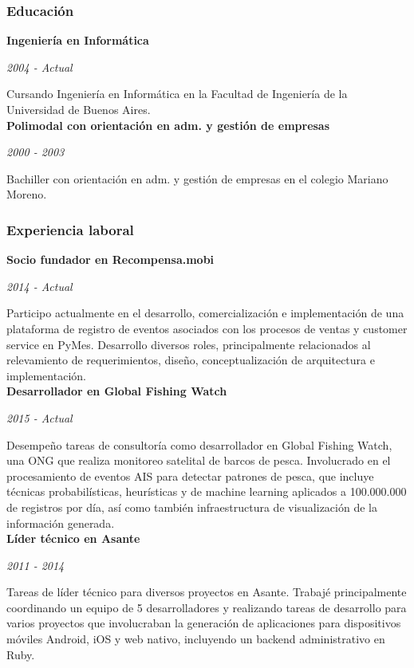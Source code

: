 \documentclass[a4paper,11pt]{article}
\begin{document}
\subsubsection{Educación}

\noindent \textbf{Ingeniería en Informática}

\noindent\emph{2004 - Actual}

\noindent Cursando Ingeniería en Informática en la Facultad de Ingeniería de la
Universidad de Buenos Aires. \\

\noindent \textbf{Polimodal con orientación en adm. y gestión de empresas}

\noindent\emph{2000 - 2003}

\noindent Bachiller con orientación en adm. y gestión de empresas en el colegio
Mariano Moreno.

\subsubsection{Experiencia laboral}

\noindent \textbf{Socio fundador en Recompensa.mobi}

\noindent \emph{2014 - Actual}

\noindent Participo actualmente en el desarrollo, comercialización e
implementación de una plataforma de registro de eventos asociados con los
procesos de ventas y customer service en PyMes. Desarrollo diversos roles,
principalmente relacionados al relevamiento de requerimientos, diseño,
conceptualización de arquitectura e implementación. \\

\noindent \textbf{Desarrollador en Global Fishing Watch}

\noindent \emph{2015 - Actual}

\noindent Desempeño tareas de consultoría como desarrollador en Global Fishing
Watch, una ONG que realiza monitoreo satelital de barcos de pesca. Involucrado
en el procesamiento de eventos AIS para detectar patrones de pesca, que incluye
técnicas probabilísticas, heurísticas y de machine learning aplicados a
100.000.000 de registros por día, así como también infraestructura de
visualización de la información generada. \\

\noindent \textbf{Líder técnico en Asante}

\noindent \emph{2011 - 2014}

\noindent Tareas de líder técnico para diversos proyectos en Asante. Trabajé
principalmente coordinando un equipo de 5 desarrolladores y realizando tareas
de desarrollo para varios proyectos que involucraban la generación de
aplicaciones para dispositivos móviles Android, iOS y web nativo, incluyendo un
backend administrativo en Ruby. \\
\end{document}
